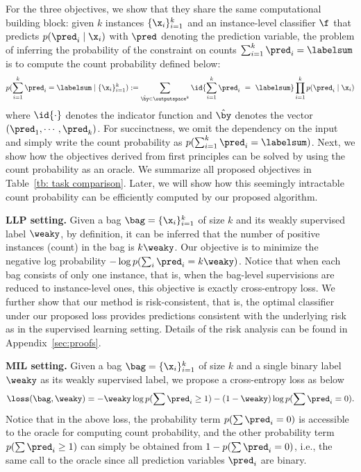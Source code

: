 \documentclass{article}
\begin{document}
For the three objectives, we show that they share the same computational building block:
given $k$ instances $\{\x_i\}_{i = 1}^k$ and an instance-level classifier $\f$ that predicts $p(\pred_i \mid \x_i)$ with $\pred$ denoting the prediction variable,
the problem of inferring the probability of the constraint on counts $\sum_{i = 1}^k \pred_i = \labelsum$ is to compute the count probability defined below:
\begin{equation*}
p(\sum_{i = 1}^k \pred_i = \labelsum \mid \{\x_i\}_{i = 1}^k)
:= \sum_{\hat{\by} \in \outputspace^k} \id{\sum_{i = 1}^k \pred_i~=~\labelsum} \prod_{i = 1}^k p(\pred_i \mid \x_i)
\end{equation*}
where $\id{\cdot}$ denotes the indicator function and $\hat{\by}$ denotes the vector $(\pred_1, \cdots, \pred_k)$.
For succinctness, we omit the dependency on the input and simply write the count probability as $p(\sum_{i = 1}^k \pred_i = \labelsum)$.
Next, we show how the objectives derived from first principles can be solved by using the count probability as an oracle.
We summarize all proposed objectives 
in Table~\ref{tb: task comparison}.
Later, we will show how this seemingly intractable count probability can be efficiently computed by our proposed algorithm.

\textbf{LLP setting.}
Given a bag $\bag = \{\x_i\}_{i = 1}^k$ of size $k$ and its weakly supervised label $\weaky$,
by definition, it can be inferred that the number of positive instances (count) in the bag is $k\weaky$.
Our objective is to minimize the negative log probability $- \log p(\sum_i \pred_i = k \weaky)$.
Notice that when each bag consists of only one instance, that is, when the bag-level supervisions are reduced to instance-level ones, this objective is exactly cross-entropy loss.
We further show that our method is risk-consistent, that is, the optimal classifier under our proposed loss provides predictions consistent with the underlying risk as in the supervised learning setting. Details of the risk analysis can be found in Appendix~\ref{sec:proofs}.





\textbf{MIL setting.}
Given a bag $\bag = \{\x_i\}_{i = 1}^k$ of size $k$ and a single binary label $\weaky$ as its weakly supervised label,
we propose a cross-entropy loss as below
\begin{equation*}
    \loss(\bag, \weaky) = -\weaky \log p(\sum \pred_i \geq 1) - (1 - \weaky) \log p(\sum \pred_i = 0).
\end{equation*}
Notice that in the above loss, the probability term $p(\sum \pred_i = 0)$ is accessible to the oracle for computing count probability, and the other probability term $p(\sum \pred_i \geq 1)$ can simply be obtained from $1 - p(\sum \pred_i = 0)$, i.e., the same call to the oracle since all prediction variables $\pred_i$ are binary. 
\end{document}
